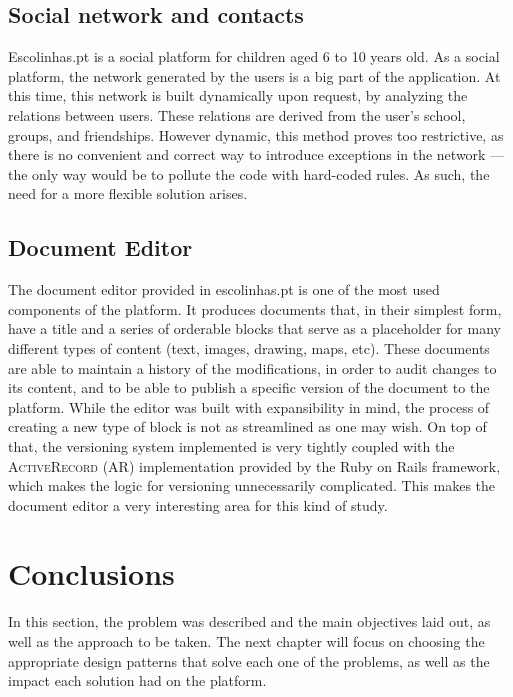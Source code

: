 \subsection{Social network and contacts}\label{sec:case-study_areas_social_network}
Escolinhas.pt is a social platform for children aged 6 to 10 years old. As a social platform, the network generated by the users is a big part of the application. At this time, this network is built dynamically upon request, by analyzing the relations between users. These relations are derived from the user's school, groups, and friendships. However dynamic, this method proves too restrictive, as there is no convenient and correct way to introduce exceptions in the network --- the only way would be to pollute the code with hard-coded rules. As such, the need for a more flexible solution arises.

\subsection{Document Editor}\label{sec:case-study_areas_document_editor}
The document editor provided in escolinhas.pt is one of the most used components of the platform. It produces documents that, in their simplest form, have a title and a series of orderable blocks that serve as a placeholder for many different types of content (text, images, drawing, maps, etc). These documents are able to maintain a history of the modifications, in order to audit changes to its content, and to be able to publish a specific version of the document to the platform. While the editor was built with expansibility in mind, the process of creating a new type of block is not as streamlined as one may wish. On top of that, the versioning system implemented is very tightly coupled with the \textsc{ActiveRecord} (AR) implementation provided by the Ruby on Rails framework, which makes the logic for versioning unnecessarily complicated. This makes the document editor a very interesting area for this kind of study.

\section{Conclusions}\label{sec:problem_statement_conclusions}

In this section, the problem was described and the main objectives laid out, as well as the approach to be taken. The next chapter will focus on choosing the appropriate design patterns that solve each one of the problems, as well as the impact each solution had on the platform.


